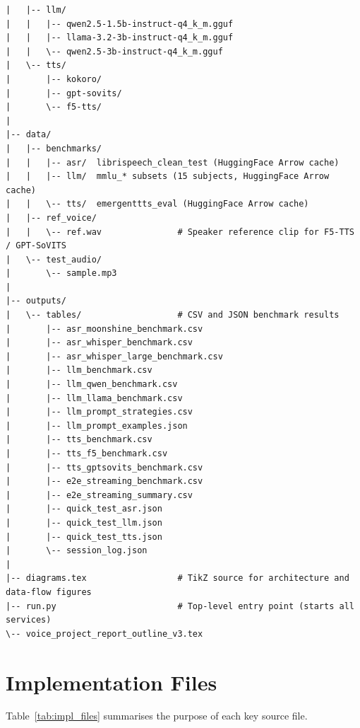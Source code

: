 \documentclass[12pt, a4paper]{article}
\begin{document}
\begin{verbatim}
|   |-- llm/
|   |   |-- qwen2.5-1.5b-instruct-q4_k_m.gguf
|   |   |-- llama-3.2-3b-instruct-q4_k_m.gguf
|   |   \-- qwen2.5-3b-instruct-q4_k_m.gguf
|   \-- tts/
|       |-- kokoro/
|       |-- gpt-sovits/
|       \-- f5-tts/
|
|-- data/
|   |-- benchmarks/
|   |   |-- asr/  librispeech_clean_test (HuggingFace Arrow cache)
|   |   |-- llm/  mmlu_* subsets (15 subjects, HuggingFace Arrow cache)
|   |   \-- tts/  emergenttts_eval (HuggingFace Arrow cache)
|   |-- ref_voice/
|   |   \-- ref.wav               # Speaker reference clip for F5-TTS / GPT-SoVITS
|   \-- test_audio/
|       \-- sample.mp3
|
|-- outputs/
|   \-- tables/                   # CSV and JSON benchmark results
|       |-- asr_moonshine_benchmark.csv
|       |-- asr_whisper_benchmark.csv
|       |-- asr_whisper_large_benchmark.csv
|       |-- llm_benchmark.csv
|       |-- llm_qwen_benchmark.csv
|       |-- llm_llama_benchmark.csv
|       |-- llm_prompt_strategies.csv
|       |-- llm_prompt_examples.json
|       |-- tts_benchmark.csv
|       |-- tts_f5_benchmark.csv
|       |-- tts_gptsovits_benchmark.csv
|       |-- e2e_streaming_benchmark.csv
|       |-- e2e_streaming_summary.csv
|       |-- quick_test_asr.json
|       |-- quick_test_llm.json
|       |-- quick_test_tts.json
|       \-- session_log.json
|
|-- diagrams.tex                  # TikZ source for architecture and data-flow figures
|-- run.py                        # Top-level entry point (starts all services)
\-- voice_project_report_outline_v3.tex
\end{verbatim}

\section{Implementation Files}

Table~\ref{tab:impl_files} summarises the purpose of each key source file.
\end{document}
